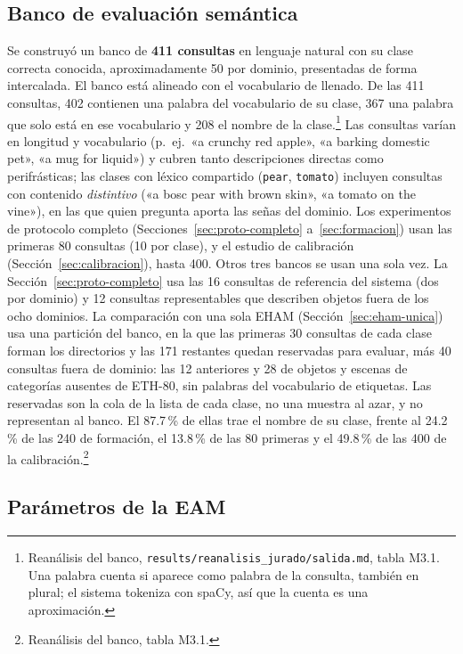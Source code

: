 \subsection{Banco de evaluación semántica}
\label{sec:banco}

Se construyó un banco de \textbf{411 consultas} en lenguaje natural con su clase
correcta conocida, aproximadamente 50 por dominio,
presentadas de forma intercalada.
El banco está alineado con el vocabulario de llenado.
De las 411 consultas, 402 contienen una palabra del vocabulario de su clase, 367 una
palabra que solo está en ese vocabulario y 208 el nombre de la clase.\footnote{Reanálisis
del banco, \texttt{results/reanalisis\_jurado/salida.md}, tabla M3.1. Una palabra cuenta
si aparece como palabra de la consulta, también en plural; el sistema tokeniza con
spaCy, así que la cuenta es una aproximación.}
Las consultas varían en longitud y vocabulario (p.\ ej.\ «a crunchy red apple»,
«a barking domestic pet», «a mug for liquid») y cubren tanto descripciones
directas como perifrásticas; las clases con léxico compartido (\texttt{pear},
\texttt{tomato}) incluyen consultas con contenido \emph{distintivo}
(«a bosc pear with brown skin», «a tomato on the vine»), en las que quien pregunta
aporta las señas del dominio.
Los experimentos de protocolo completo (Secciones~\ref{sec:proto-completo}
a~\ref{sec:formacion}) usan las primeras 80 consultas (10 por clase), y el estudio de
calibración (Sección~\ref{sec:calibracion}), hasta 400.
Otros tres bancos se usan una sola vez.
La Sección~\ref{sec:proto-completo} usa las 16 consultas de referencia del sistema (dos
por dominio) y 12 consultas representables que describen objetos fuera de los ocho
dominios.
La comparación con una sola EHAM (Sección~\ref{sec:eham-unica}) usa una partición del
banco, en la que las primeras 30 consultas de cada clase forman los directorios y las 171
restantes quedan reservadas para evaluar, más 40 consultas fuera de dominio: las 12
anteriores y 28 de objetos y escenas de categorías ausentes de ETH-80, sin palabras del
vocabulario de etiquetas.
Las reservadas son la cola de la lista de cada clase, no una muestra al azar, y no
representan al banco.
El 87.7\,\% de ellas trae el nombre de su clase, frente al 24.2\,\% de las 240 de
formación, el 13.8\,\% de las 80 primeras y el 49.8\,\% de las 400 de la
calibración.\footnote{Reanálisis del banco, tabla M3.1.}

\subsection{Parámetros de la EAM}
\label{sec:parametros}

